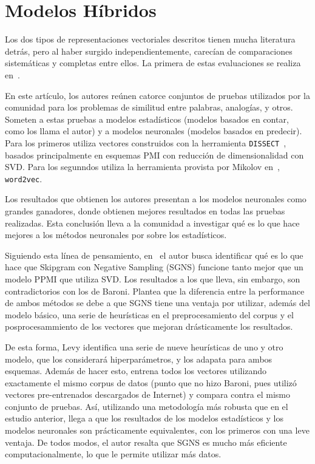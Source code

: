 \section{Modelos Híbridos}

Los dos tipos de representaciones vectoriales descritos tienen mucha literatura detrás, pero al
haber surgido independientemente, carecían de comparaciones sistemáticas y completas entre ellos. La
primera de estas evaluaciones se realiza en~\cite{Baroni2014}.

En este artículo, los autores reúnen catorce conjuntos de pruebas utilizados por la comunidad para
los problemas de similitud entre palabras, analogías, y otros. Someten a estas pruebas a modelos
estadísticos (modelos basados en contar, como los llama el autor) y a modelos neuronales (modelos
basados en predecir). Para los primeros utiliza vectores construidos con la herramienta
\texttt{DISSECT}~\cite{Dinu2013}, basados principalmente en esquemas PMI con reducción de
dimensionalidad con SVD\@. Para los segunndos utiliza la herramienta provista por Mikolov
en~\cite{Mikolov2013c}, \texttt{word2vec}.

Los resultados que obtienen los autores presentan a los modelos neuronales como grandes ganadores,
donde obtienen mejores resultados en todas las pruebas realizadas. Esta conclusión lleva a la
comunidad a investigar qué es lo que hace mejores a los métodos neuronales por sobre los
estadísticos.

Siguiendo esta línea de pensamiento, en~\cite{Levy2015} el autor busca identificar qué es lo que
hace que Skipgram con Negative Sampling (SGNS) funcione tanto mejor que un modelo PPMI que utiliza
SVD\@. Los resultados a los que lleva, sin embargo, son contradictorios con los de Baroni. Plantea
que la diferencia entre la performance de ambos métodos se debe a que SGNS tiene una ventaja por
utilizar, además del modelo básico, una serie de heurísticas en el preprocesamiento del corpus y el
posprocesammiento de los vectores que mejoran drásticamente los resultados.

De esta forma, Levy identifica una serie de nueve heurísticas de uno y otro modelo, que los
considerará hiperparámetros, y los adapata para ambos esquemas. Además de hacer esto, entrena todos
los vectores utilizando exactamente el mismo corpus de datos (punto que no hizo Baroni, pues utilizó
vectores pre-entrenados descargados de Internet) y compara contra el mismo conjunto de pruebas. Así,
utilizando una metodología más robusta que en el estudio anterior, llega a que los resultados de los
modelos estadísticos y los modelos neuronales son prácticamente equivalentes, con los primeros con
una leve ventaja. De todos modos, el autor resalta que SGNS es mucho más eficiente
computacionalmente, lo que le permite utilizar más datos.


